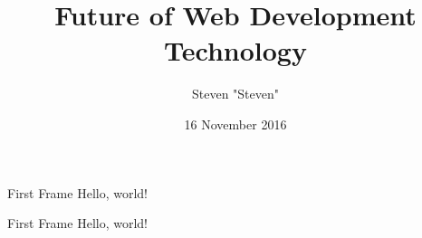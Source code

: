 \documentclass{beamer}
\title{Future of Web Development Technology}
\date{16 November 2016}
\author{Steven "Steven"}
\institute{BINUS INTERNATIONAL}
\begin{document}
  \maketitle
  
  \begin{frame}{First Frame}
    Hello, world!
  \end{frame}
  
    \begin{frame}{First Frame}
    Hello, world!
  \end{frame}
\end{document}
